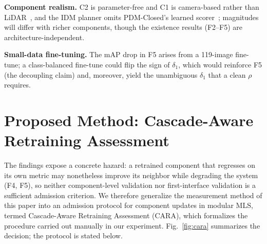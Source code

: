 \documentclass[conference]{IEEEtran}
\begin{document}
\textbf{Component realism.} C2 is parameter-free and C1 is camera-based rather
than LiDAR~\cite{yin2021center}, and the IDM planner omits PDM-Closed's learned
scorer~\cite{dauner2023parting}; magnitudes will differ with richer components,
though the existence results (F2--F5) are architecture-independent.

\textbf{Small-data fine-tuning.} The mAP drop in F5 arises from a 119-image
fine-tune; a class-balanced fine-tune could flip the sign of $\delta_1$, which
would reinforce F5 (the decoupling claim) and, moreover, yield the unambiguous
$\delta_1$ that a clean $\rho$ requires.

\section{Proposed Method: Cascade-Aware Retraining Assessment}
\label{sec:cara}
The findings expose a concrete hazard: a retrained component that regresses on
its own metric may nonetheless improve its neighbor while degrading the system
(F4, F5), so neither component-level validation nor first-interface validation
is a sufficient admission criterion. We therefore generalize the measurement
method of this paper into an admission protocol for component updates in
modular MLS, termed Cascade-Aware Retraining Assessment (CARA), which formalizes
the procedure carried out manually in our experiment. Fig.~\ref{fig:cara}
summarizes the decision; the protocol is stated below.
\end{document}
